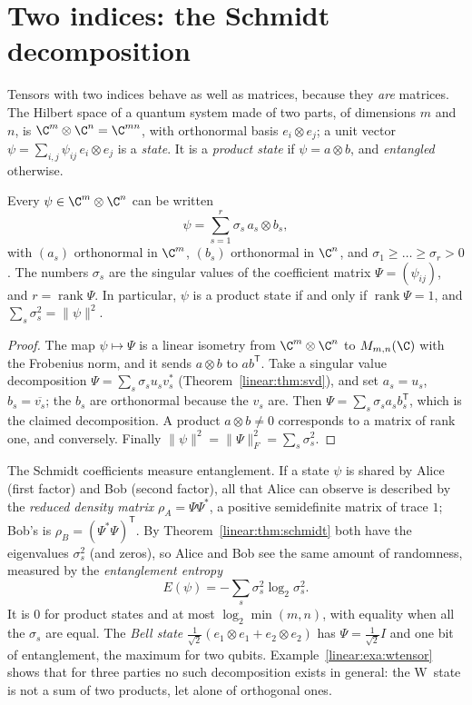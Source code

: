 \section{Two indices: the Schmidt decomposition}

Tensors with two indices behave as well as matrices, because they \emph{are} matrices. The Hilbert space of a quantum system made of
two parts, of dimensions $m$ and $n$, is $\C^m\otimes\C^n=\C^{mn}$, with orthonormal basis $e_i\otimes e_j$; a unit vector $\psi=\sum_{i,j}
\psi_{ij}\,e_i\otimes e_j$ is a \emph{state}. It is a \emph{product state} if $\psi=a\otimes b$, and \emph{entangled} otherwise.

\begin{theorem}\label{linear:thm:schmidt}
Every $\psi\in\C^m\otimes\C^n$ can be written
\[
\psi=\sum_{s=1}^r\sigma_s\,a_s\otimes b_s,
\]
with $(a_s)$ orthonormal in $\C^m$, $(b_s)$ orthonormal in $\C^n$, and $\sigma_1\ge\dots\ge\sigma_r>0$. The numbers $\sigma_s$ are the
singular values of the coefficient matrix $\Psi=(\psi_{ij})$, and $r=\operatorname{rank}\Psi$. In particular, $\psi$ is a product
state if and only if $\operatorname{rank}\Psi=1$, and $\sum_s\sigma_s^2=\|\psi\|^2$.
\end{theorem}
\begin{proof}
The map $\psi\mapsto\Psi$ is a linear isometry from $\C^m\otimes\C^n$ to $M_{m,n}(\C)$ with the Frobenius norm, and it sends $a\otimes b$
to $ab^{\mathsf T}$. Take a singular value decomposition $\Psi=\sum_s\sigma_su_sv_s^*$ (Theorem~\ref{linear:thm:svd}), and set $a_s=u_s$,
$b_s=\overline{v_s}$; the $b_s$ are orthonormal because the $v_s$ are. Then $\Psi=\sum_s\sigma_sa_sb_s^{\mathsf T}$, which is the
claimed decomposition. A product $a\otimes b\ne0$ corresponds to a matrix of rank one, and conversely. Finally $\|\psi\|^2=
\|\Psi\|_F^2=\sum_s\sigma_s^2$.
\end{proof}

The Schmidt coefficients measure entanglement. If a state $\psi$ is shared by Alice (first factor) and Bob (second factor), all
that Alice can observe is described by the \emph{reduced density matrix} $\rho_A=\Psi\Psi^*$, a positive semidefinite matrix of trace
$1$; Bob's is $\rho_B=(\Psi^*\Psi)^{\mathsf T}$. By Theorem~\ref{linear:thm:schmidt} both have the eigenvalues $\sigma_s^2$ (and zeros), so
Alice and Bob see the same amount of randomness, measured by the \emph{entanglement entropy}
\[
E(\psi)=-\sum_s\sigma_s^2\log_2\sigma_s^2.
\]
It is $0$ for product states and at most $\log_2\min(m,n)$, with equality when all the $\sigma_s$ are equal. The \emph{Bell state}
$\frac1{\sqrt2}(e_1\otimes e_1+e_2\otimes e_2)$ has $\Psi=\frac1{\sqrt2}I$ and one bit of entanglement, the maximum for two qubits.
Example~\ref{linear:exa:wtensor} shows that for three parties no such decomposition exists in general: the W~state is not a sum of two
products, let alone of orthogonal ones.

